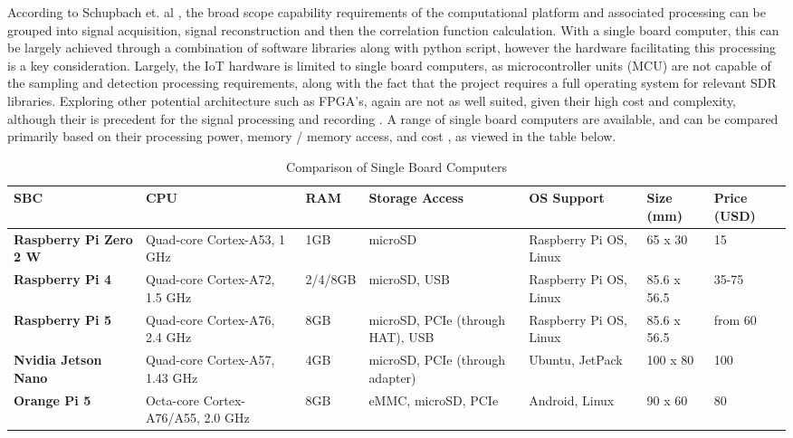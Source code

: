 \par \vspace{0.5cm} 
\noindent According to Schupbach et. al \cite{DABprocessingChain}, the broad scope capability requirements of the computational platform and associated processing can be grouped into signal acquisition, signal reconstruction and then the correlation function calculation. With a single board computer, this can be largely achieved through a combination of software libraries along with python script, however the hardware facilitating this processing is a key consideration. Largely, the IoT hardware is limited to single board computers, as microcontroller units (MCU) are not capable of the sampling and detection processing requirements, along with the fact that the project requires a full operating system for relevant SDR libraries. Exploring other potential architecture such as FPGA's, again are not as well suited, given their high cost and complexity, although their is precedent for the signal processing and recording \cite{FPGAhardware}. A range of single board computers are available, and can be compared primarily based on their processing power, memory / memory access, and cost \cite{sbc_hardware}, as viewed in the table below.

\begin{table}[h!]
    \centering
    \begin{tabularx}{\textwidth}{|p{3cm}|X|X|X|X|X|p{2cm}|}
    \hline
    \textbf{SBC} & \textbf{CPU} & \textbf{RAM} & \textbf{Storage Access} & \textbf{OS Support} & \textbf{Size (mm)} & \textbf{Price (USD)} \\
    \hline
    \textbf{Raspberry Pi Zero 2 W} & Quad-core Cortex-A53, 1 GHz & 1GB & microSD & Raspberry Pi OS, Linux & 65 x 30 & 15 \\
    \hline
    \textbf{Raspberry Pi 4} & Quad-core Cortex-A72, 1.5 GHz & 2/4/8GB & microSD, USB & Raspberry Pi OS, Linux & 85.6 x 56.5 & 35-75 \\
    \hline
    \textbf{Raspberry Pi 5} & Quad-core Cortex-A76, 2.4 GHz & 8GB & microSD, PCIe (through HAT), USB & Raspberry Pi OS, Linux & 85.6 x 56.5 & from 60 \\
    \hline
    \textbf{Nvidia Jetson Nano} & Quad-core Cortex-A57, 1.43 GHz & 4GB & microSD, PCIe (through adapter) & Ubuntu, JetPack & 100 x 80 & 100 \\
    \hline
    \textbf{Orange Pi 5} & Octa-core Cortex-A76/A55, 2.0 GHz & 8GB & eMMC, microSD, PCIe & Android, Linux & 90 x 60 & 80 \\
    \hline
    \end{tabularx}
    \caption{Comparison of Single Board Computers \cite{sbc_hardware}}
    \label{tab:sbc_comparison}
    
\end{table}


